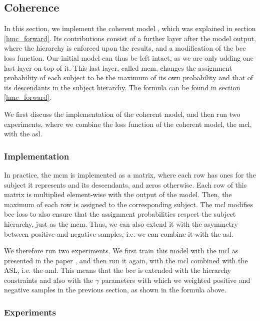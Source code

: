 \subsection{Coherence} \label{supervised_approach_coherence}

In this section, we implement the coherent model \cite{giunchiglia2020coherent}, which was explained in section \ref{hmc_forward}. Its contributions consist of a further layer after the model output, where the hierarchy is enforced upon the results, and a modification of the \acrfull{bce} loss function. Our initial model can thus be left intact, as we are only adding one last layer on top of it. This last layer, called \acrfull{mcm}, changes the assignment probability of each subject to be the maximum of its own probability and that of its descendants in the subject hierarchy. The formula can be found in section \ref{hmc_forward}.

We first discuss the implementation of the coherent model, and then run two experiments, where we combine the loss function of the coherent model, the \acrfull{mcl}, with the \acrfull{asl}.

\subsubsection{Implementation}

In practice, the \acrshort{mcm} is implemented as a matrix, where each row has ones for the subject it represents and its descendants, and zeros otherwise. Each row of this matrix is multiplied element-wise with the output of the model. Then, the maximum of each row is assigned to the corresponding subject. The \acrfull{mcl} modifies \acrshort{bce} loss to also ensure that the assignment probabilities respect the subject hierarchy, just as the \acrshort{mcm}. Thus, we can also extend it with the asymmetry between positive and negative samples, i.e. we can combine it with the \acrfull{asl}.

We therefore run two experiments. We first train this model with the \acrshort{mcl} as presented in the paper \cite{giunchiglia2020coherent}, and then run it again, with the \acrshort{mcl} combined with the ASL, i.e. the \acrfull{aml}. This means that the \acrshort{bce} is extended with the hierarchy constraints and also with the $\gamma$ parameters with which we weighted positive and negative samples in the previous section, as shown in the formula above.

\subsubsection{Experiments}

